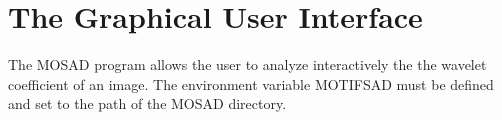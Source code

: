 \chapter{The Graphical User Interface}
\label{ch_mosad}

The MOSAD program allows the user to analyze 
interactively the the wavelet coefficient of an image.
The environment variable MOTIFSAD must be defined and set to
the path of the MOSAD directory.

